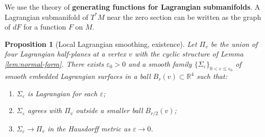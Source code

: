 \documentclass[12pt]{article}
\newtheorem{proposition}[theorem]{Proposition}
\newcommand{\bR}{\mathbb{R}}
\newcommand{\eps}{\varepsilon}
\begin{document}
We use the theory of \textbf{generating functions for Lagrangian submanifolds}. A Lagrangian submanifold of $T^*M$ near the zero section can be written as the graph of $dF$ for a function $F$ on $M$.

\begin{proposition}[Local Lagrangian smoothing, existence]
\label{prop:local-exist}
Let $\Pi_v$ be the union of four Lagrangian half-planes at a vertex $v$ with the cyclic structure of Lemma \ref{lem:normal-form}. There exists $\eps_0 > 0$ and a smooth family $\{\Sigma_\eps\}_{0 < \eps \leq \eps_0}$ of smooth embedded Lagrangian surfaces in a ball $B_r(v) \subset \bR^4$ such that:
\begin{enumerate}[label=(\roman*)]
  \item $\Sigma_\eps$ is Lagrangian for each $\eps$;
  \item $\Sigma_\eps$ agrees with $\Pi_v$ outside a smaller ball $B_{r/2}(v)$;
  \item $\Sigma_\eps \to \Pi_v$ in the Hausdorff metric as $\eps \to 0$.
\end{enumerate}
\end{proposition}
\end{document}
